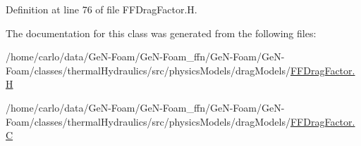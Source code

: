 Definition at line 76 of file F\+F\+Drag\+Factor.\+H.



The documentation for this class was generated from the following files\+:\begin{DoxyCompactItemize}
\item 
/home/carlo/data/\+Ge\+N-\/\+Foam/\+Ge\+N-\/\+Foam\+\_\+ffn/\+Ge\+N-\/\+Foam/\+Ge\+N-\/\+Foam/classes/thermal\+Hydraulics/src/physics\+Models/drag\+Models/\hyperlink{FFDragFactor_8H}{F\+F\+Drag\+Factor.\+H}\item 
/home/carlo/data/\+Ge\+N-\/\+Foam/\+Ge\+N-\/\+Foam\+\_\+ffn/\+Ge\+N-\/\+Foam/\+Ge\+N-\/\+Foam/classes/thermal\+Hydraulics/src/physics\+Models/drag\+Models/\hyperlink{FFDragFactor_8C}{F\+F\+Drag\+Factor.\+C}\end{DoxyCompactItemize}
